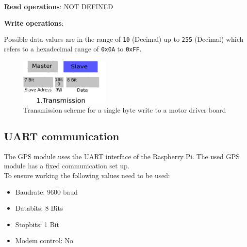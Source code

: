 \begin{itemize}

\textbf{Read operations}: NOT DEFINED	

\textbf{Write operations}:

Possible data values are in the range of \texttt{10} (Decimal) up to \texttt{255} (Decimal) which refers to a hexadecimal range of \texttt{0x0A} to \texttt{0xFF}.

\begin{figure}[H]
	\centering\includegraphics[width=0.4\textwidth]{fig/I2C_Adressing/Motor_write}
	\caption[Scheme for a single byte write to a motor driver board]{Transmission scheme for a single byte write to a motor driver board}
	\label{fig:Motor}
\end{figure}



\end{itemize}

\subsection{UART communication}
\label{sec:hardware:Components:UART}
The GPS module uses the UART interface of the Raspberry Pi. The used GPS module has a fixed communication set up.\\
To ensure working the following values need to be used:
\begin{itemize}
	\item Baudrate: 9600 baud
	\item Databits: 8 Bits
	\item Stopbits:	1 Bit
	\item Modem control: No
\end{itemize}


